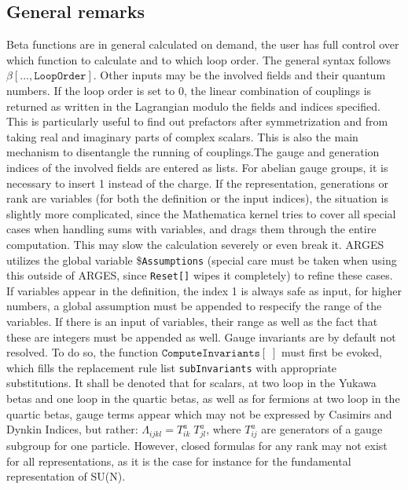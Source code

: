 \documentclass{scrartcl}
\begin{document}
\subsection{General remarks}
Beta functions are in general calculated on demand, the user has full control over which function to calculate and to which loop order. The general syntax follows $\mathtt{\beta[..., Loop Order]}$. Other inputs may be the involved fields and their quantum numbers. If the loop order is set to 0, the linear combination of couplings is returned as written in the Lagrangian modulo the fields and indices specified. This is particularly useful to find out prefactors after symmetrization and from taking real and imaginary parts of complex scalars. This is also the main mechanism to disentangle the running of couplings.\newline The gauge and generation indices of the involved fields are entered as lists. For abelian gauge groups, it is necessary to insert 1 instead of the charge. If the representation, generations or rank are variables (for both the definition or the input indices), the situation is slightly more complicated, since the Mathematica kernel tries to cover all special cases when handling sums with variables, and drags them through the entire computation. This may slow the calculation severely or even break it. ARGES utilizes the global variable \$\texttt{Assumptions} (special care must be taken when using this outside of ARGES, since \texttt{Reset[]} wipes it completely) to refine these cases. If variables appear in the definition, the index 1 is always safe as input, for higher numbers, a global assumption must be appended to respecify the range of the variables. If there is an input of variables, their range as well as the fact that these are integers must be appended as well. \newline 
Gauge invariants are by default not resolved. To do so, the function $\mathtt{ComputeInvariants[\;]}$ must first be evoked, which fills the replacement rule list \texttt{subInvariants} with appropriate substitutions. It shall be denoted that for scalars, at two loop in the Yukawa betas and one loop in the quartic betas, as well as for fermions at two loop in the quartic betas, gauge terms appear which may not be expressed by Casimirs and Dynkin Indices, but rather: $ \Lambda_{ijkl} = T ^a_{ik}\;T^a_{jl}$, where $T^a_{ij}$ are generators of a gauge subgroup for one particle. However, closed formulas for any rank may not exist for all representations, as it is the case for instance for the fundamental representation of SU(N).
\end{document}
